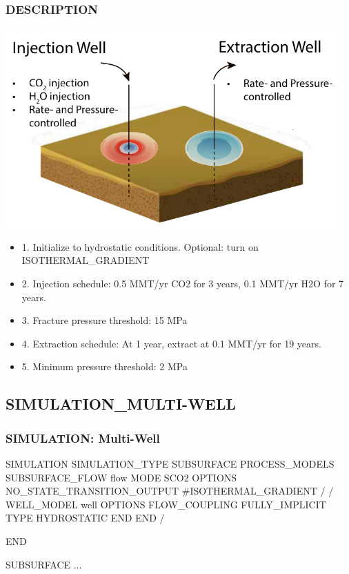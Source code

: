\documentclass{beamer}
\newcommand\bluecomment[1]{{{\color{blue} #1}}}
\begin{document}
\begin{frame}\frametitle{DESCRIPTION}

\includegraphics[height=3in]{multi-well-fig.pdf}

\newpage
\begin{itemize}
  \item 1. Initialize to hydrostatic conditions. Optional: turn on \bluecomment{ISOTHERMAL\_GRADIENT}
  \item 2. Injection schedule: 0.5 MMT/yr CO2 for 3 years, 0.1 MMT/yr H2O for 7 years.
  \item 3. Fracture pressure threshold: 15 MPa
  \item 4. Extraction schedule: At 1 year, extract at 0.1 MMT/yr for 19 years.
  \item 5. Minimum pressure threshold: 2 MPa
\end{itemize}

\end{frame}

\subsection{SIMULATION\_MULTI-WELL}

\begin{frame}\frametitle{SIMULATION: Multi-Well}
\begin{semiverbatim}
SIMULATION
  SIMULATION_TYPE SUBSURFACE
  PROCESS_MODELS
    SUBSURFACE_FLOW flow
      MODE SCO2
      OPTIONS
        NO_STATE_TRANSITION_OUTPUT
        \bluecomment{#ISOTHERMAL_GRADIENT}
      /
    /
\newpage
    WELL_MODEL well
      OPTIONS
        FLOW_COUPLING FULLY_IMPLICIT
        TYPE HYDROSTATIC
      END
    END
  /

END

SUBSURFACE
...

\end{semiverbatim}

\end{frame}
\end{document}
